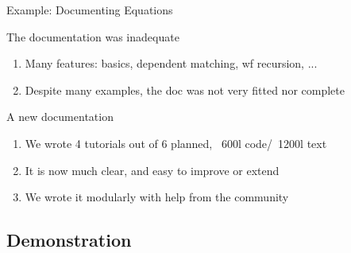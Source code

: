 \documentclass[10pt]{beamer}
\begin{document}
\begin{frame}{Example: Documenting Equations}
  \vspace*{-3pt}
  \begin{tcbPbl}{The documentation was inadequate}
    \begin{enumerate}
      \item Many features: basics, dependent matching, wf recursion, ...
      \item Despite many examples, the doc was not very fitted nor complete
    \end{enumerate}
  \end{tcbPbl}
  \vspace*{-3pt}
   \begin{tcbProp}{A new documentation}
    \begin{enumerate}
      \item We wrote 4 tutorials out of 6 planned, ~600l code/~1200l text
      \item It is now much clear, and easy to improve or extend
      \item We wrote it modularly with help from the community
    \end{enumerate}
  \end{tcbProp}
\end{frame}

\subsection{Demonstration}

\end{document}
